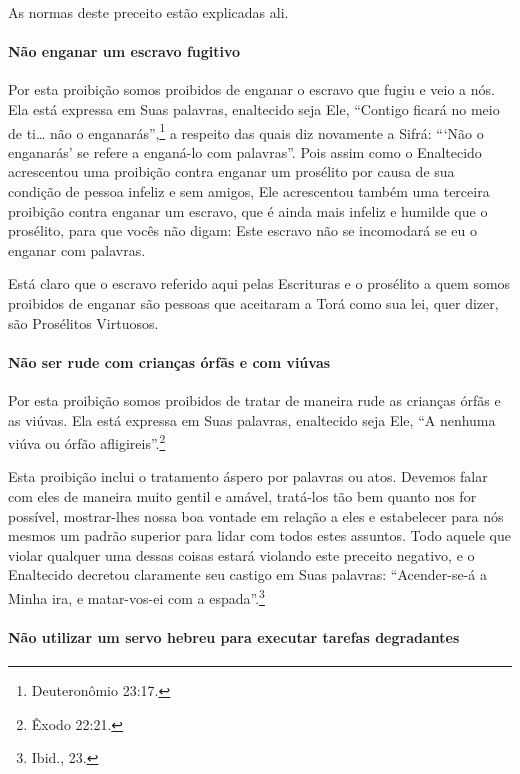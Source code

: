 As normas deste preceito estão explicadas ali.

\paragraph{Não enganar um escravo fugitivo}

Por esta proibição somos proibidos de enganar o escravo que fugiu e veio
a nós. Ela está expressa em Suas palavras, enaltecido seja Ele,
``Contigo ficará no meio de ti\ldots{} não o enganarás'',\footnote{Deuteronômio
23:17.} a respeito das quais diz novamente a Sifrá: ```Não o enganarás'
se refere a enganá-lo com palavras''. Pois assim como o Enaltecido
acrescentou uma proibição contra enganar um prosélito por causa de sua
condição de pessoa infeliz e sem amigos, Ele acrescentou também uma
terceira proibição contra enganar um escravo, que é ainda mais infeliz e
humilde que o prosélito, para que vocês não digam: Este escravo não se
incomodará se eu o enganar com palavras.

Está claro que o escravo referido aqui pelas Escrituras e o prosélito a
quem somos proibidos de enganar são pessoas que aceitaram a Torá como
sua lei, quer dizer, são Prosélitos Virtuosos.

\paragraph{Não ser rude com crianças órfãs e com viúvas}

Por esta proibição somos proibidos de tratar de maneira rude as
crianças órfãs e as viúvas. Ela está expressa em Suas palavras,
enaltecido seja Ele, ``A nenhuma viúva ou órfão afligireis''.\footnote{Êxodo
22:21.}


Esta proibição inclui o tratamento áspero por palavras ou atos. Devemos
falar com eles de maneira muito gentil e amável, tratá-los tão bem
quanto nos for possível, mostrar-lhes nossa boa vontade em relação a
eles e estabelecer para nós mesmos um padrão superior para lidar com
todos estes assuntos. Todo aquele que violar qualquer uma dessas coisas
estará violando este preceito negativo, e o Enaltecido decretou
claramente seu castigo em Suas palavras: ``Acender-se-á a Minha ira, e
matar-vos-ei com a espada''.\footnote{Ibid., 23.}

\paragraph{Não utilizar um servo hebreu para executar tarefas degradantes}

